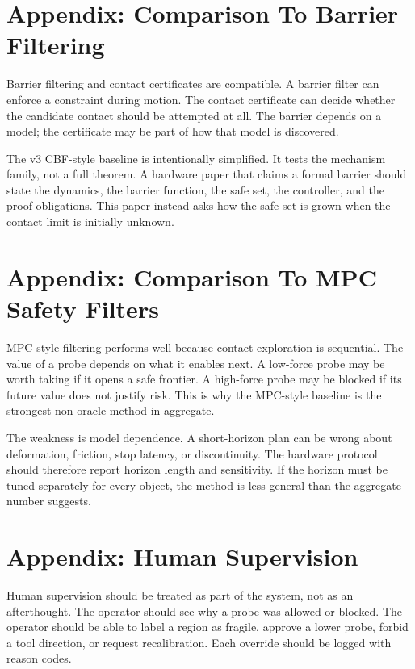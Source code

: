 \documentclass{article}
\begin{document}
\section{Appendix: Comparison To Barrier Filtering}

Barrier filtering and contact certificates are compatible. A barrier filter can
enforce a constraint during motion. The contact certificate can decide whether
the candidate contact should be attempted at all. The barrier depends on a
model; the certificate may be part of how that model is discovered.

The v3 CBF-style baseline is intentionally simplified. It tests the mechanism
family, not a full theorem. A hardware paper that claims a formal barrier
should state the dynamics, the barrier function, the safe set, the controller,
and the proof obligations. This paper instead asks how the safe set is grown
when the contact limit is initially unknown.

\section{Appendix: Comparison To MPC Safety Filters}

MPC-style filtering performs well because contact exploration is sequential.
The value of a probe depends on what it enables next. A low-force probe may be
worth taking if it opens a safe frontier. A high-force probe may be blocked if
its future value does not justify risk. This is why the MPC-style baseline is
the strongest non-oracle method in aggregate.

The weakness is model dependence. A short-horizon plan can be wrong about
deformation, friction, stop latency, or discontinuity. The hardware protocol
should therefore report horizon length and sensitivity. If the horizon must be
tuned separately for every object, the method is less general than the
aggregate number suggests.

\section{Appendix: Human Supervision}

Human supervision should be treated as part of the system, not as an
afterthought. The operator should see why a probe was allowed or blocked. The
operator should be able to label a region as fragile, approve a lower probe,
forbid a tool direction, or request recalibration. Each override should be
logged with reason codes.
\end{document}
